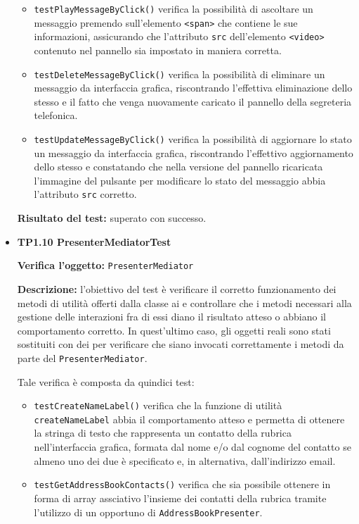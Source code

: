 \begin{itemize}
\begin{itemize}
\item \texttt{testPlayMessageByClick()} verifica la possibilità di ascoltare un messaggio premendo sull'elemento \verb'<span>' che contiene le sue informazioni, assicurando che l'attributo \verb'src' dell'elemento \verb'<video>' contenuto nel pannello sia impostato in maniera corretta.

\item \texttt{testDeleteMessageByClick()} verifica la possibilità di eliminare un messaggio da interfaccia grafica, riscontrando l'effettiva eliminazione dello stesso e il fatto che venga nuovamente caricato il pannello della segreteria telefonica.

\item \texttt{testUpdateMessageByClick()} verifica la possibilità di aggiornare lo stato un messaggio da interfaccia grafica, riscontrando l'effettivo aggiornamento dello stesso e constatando che nella versione del pannello ricaricata l'immagine del pulsante per modificare lo stato del messaggio abbia l'attributo \verb'src' corretto.

\end{itemize}
\textbf{Risultato del test:} superato con successo.

\item[\passed] \textbf{TP1.10 PresenterMediatorTest}

\textbf{Verifica l'oggetto:} \texttt{PresenterMediator}

\textbf{Descrizione:} l'obiettivo del test è verificare il corretto funzionamento dei metodi di utilità offerti dalla classe ai  e controllare che i metodi necessari alla gestione delle interazioni fra di essi diano il risultato atteso o abbiano il comportamento corretto. In quest'ultimo caso, gli oggetti reali sono stati sostituiti con dei  per verificare che siano invocati correttamente i metodi da parte del \texttt{PresenterMediator}.

Tale verifica è composta da quindici test:
\begin{itemize}
\item \texttt{testCreateNameLabel()} verifica che la funzione di utilità \verb'createNameLabel' abbia il comportamento atteso e permetta di ottenere la stringa di testo che rappresenta un contatto della rubrica nell'interfaccia grafica, formata dal nome e/o dal cognome del contatto se almeno uno dei due è specificato e, in alternativa, dall'indirizzo email.

\item \texttt{testGetAddressBookContacts()}  verifica che sia possibile ottenere in forma di array assciativo l'insieme dei contatti della rubrica tramite l'utilizzo di un opportuno  di \verb'AddressBookPresenter'.


\end{itemize}
\end{itemize}
